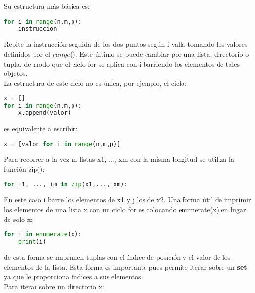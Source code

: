 \documentclass[10pt,oneside]{article}
\begin{document}
\begin{multicols}{2}
                Su estructura más básica es:
               
                \begin{lstlisting}[language=Python]
for i in range(n,m,p):
    instruccion
                \end{lstlisting}

                Repite la instrucción seguida de los dos puntos según i valla tomando los valores definidos por el $range$(). Este último se puede cambiar por una lista, directorio o tupla, de modo que el ciclo for se aplica con i barriendo los elementos de tales objetos. \\ \newline La estructura de este ciclo no es única, por ejemplo, el ciclo:

                \begin{lstlisting}[language=Python]
x = []
for i in range(n,m,p):
    x.append(valor)                    
                \end{lstlisting}
                
                es equivalente a escribir:

                \begin{lstlisting}[language=Python]
x = [valor for i in range(n,m,p)]
                \end{lstlisting}
                
                Para recorrer a la vez m listas x1, ..., xm con la misma longitud se utiliza la función zip():

                \begin{lstlisting}[language=Python]
for i1, ..., im in zip(x1,..., xm):
                \end{lstlisting}

                En este caso i barre los elementos de x1 y j los de x2. Una forma útil de imprimir los elementos de una lista x con un ciclo for es colocando enumerate(x) en lugar de solo x:

                \begin{lstlisting}[language=Python]
for i in enumerate(x):
    print(i)
                \end{lstlisting}

                de esta forma se imprimen tuplas con el índice de posición y el valor de los elementos de la lista.  Esta forma es importante pues permite iterar sobre un \textbf{set} ya que le proporciona índices a sus elementos.\\ \newline Para iterar sobre un directorio x:


\end{multicols}
\end{document}
